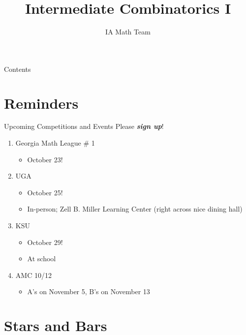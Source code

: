 \documentclass[aspectratio=169,xcolor=dvipsnames]{beamer}
\title[Intermediate Combinatorics I]{Intermediate Combinatorics I}
\author[IA Math Team]{IA Math Team}
\begin{document}
\begin{frame}[t]
  \titlepage
\end{frame}

\begin{frame}[t]{Contents}
  \tableofcontents
\end{frame}


\section{Reminders}

\begin{frame}[t]{Upcoming Competitions and Events}
    Please \textit{\textbf{sign up}}!
    \vspace{0.2cm}
    \begin{enumerate}
        \item Georgia Math League \# 1  %
        \begin{itemize}
            \item October 23!
        \end{itemize}
        \item UGA
        \begin{itemize}
            \item October 25!
            \item In-person; Zell B. Miller Learning Center (right across nice dining hall)
        \end{itemize}
        \item KSU
        \begin{itemize}
            \item October 29!
            \item At school
        \end{itemize}
        \item AMC 10/12
        \begin{itemize}
            \item A's on November 5, B's on November 13
        \end{itemize}
    \end{enumerate}
\end{frame}

\section{Stars and Bars}
\end{document}
